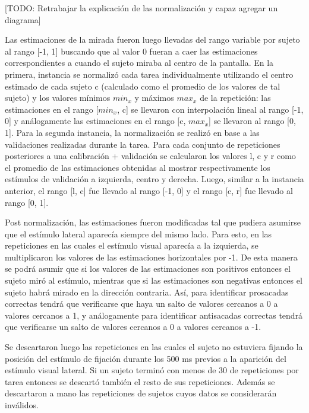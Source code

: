 [TODO: Retrabajar la explicación de las normalización y capaz agregar un diagrama]

Las estimaciones de la mirada fueron luego llevadas del rango variable por
sujeto al rango [-1, 1] buscando que al valor 0 fueran a caer las estimaciones
correspondientes a cuando el sujeto miraba al centro de la pantalla.
En la primera, instancia se normalizó cada tarea individualmente utilizando el
centro estimado de cada sujeto c (calculado como el promedio de los valores de
tal sujeto) y los valores mínimos $min_x$ y máximos $max_x$ de la repetición:
las estimaciones en el rango [$min_x$, c] se llevaron con interpolación lineal
al rango [-1, 0] y análogamente las estimaciones en el rango [c, $max_x$] se
llevaron al rango [0, 1].
Para la segunda instancia, la normalización se realizó en base a las
validaciones realizadas durante la tarea.
Para cada conjunto de repeticiones posteriores a una calibración + validación
se calcularon los valores l, c y r como el promedio de las estimaciones
obtenidas al mostrar respectivamente los estímulos de validación a izquierda,
centro y derecha.
Luego, similar a la instancia anterior, el rango [l, c] fue llevado al rango
[-1, 0] y el rango [c, r] fue llevado al rango [0, 1].

Post normalización, las estimaciones fueron modificadas tal que pudiera
asumirse que el estímulo lateral aparecía siempre del mismo lado.
Para esto, en las repeticiones en las cuales el estímulo visual aparecía a la
izquierda, se multiplicaron los valores de las estimaciones horizontales por
-1.
De esta manera se podrá asumir que si los valores de las estimaciones son
positivos entonces el sujeto miró al estímulo, mientras que si las estimaciones
son negativas entonces el sujeto habrá mirado en la dirección contraria.
Así, para identificar prosacadas correctas tendrá que verificarse que haya un
salto de valores cercanos a 0 a valores cercanos a 1, y análogamente para
identificar antisacadas correctas tendrá que verificarse un salto de valores
cercanos a 0 a valores cercanos a -1.

Se descartaron luego las repeticiones en las cuales el sujeto no estuviera
fijando la posición del estímulo de fijación durante los 500 ms previos a la
aparición del estímulo visual lateral.
Si un sujeto terminó con menos de 30 de repeticiones por tarea entonces se
descartó también el resto de sus repeticiones.
Además se descartaron a mano las repeticiones de sujetos cuyos datos se
considerarán inválidos.
